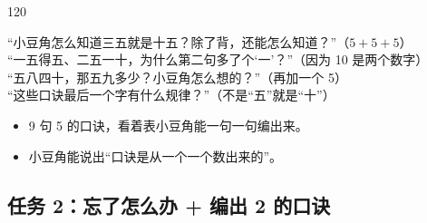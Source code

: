 \begin{lesson}{1}{20}
\begin{saybox}
“小豆角怎么知道三五就是十五？除了背，还能怎么知道？”（$5+5+5$）\\
“一五得五、二五一十，为什么第二句多了个‘一’？”（因为 10 是两个数字）\\
“五八四十，那五九多少？小豆角怎么想的？”（再加一个 5）\\
“这些口诀最后一个字有什么规律？”（不是“五”就是“十”）
\end{saybox}

\begin{passbox}
\begin{itemize}
  \item 9 句 5 的口诀，看着表小豆角能一句一句编出来。
  \item 小豆角能说出“口诀是从一个一个数出来的”。
\end{itemize}
\end{passbox}
\end{lesson}

\subsection{任务 2：忘了怎么办 + 编出 2 的口诀}

